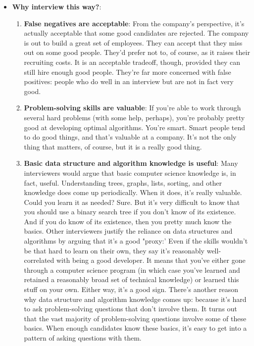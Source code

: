 \documentclass{report}
\begin{document}
\begin{itemize}
\begin{itemize}
            \end{itemize}
        \item \textbf{Why interview this way?}: 
            \begin{enumerate}
                \item \textbf{False negatives are acceptable}:  From the company's perspective, it's actually acceptable that some good candidates are rejected. The company is out to build a great set of employees. They can accept that they miss out on some good people. They'd prefer not to, of course, as it raises their recruiting costs. It is an acceptable tradeoff, though, provided they can still hire enough good people. 
                    \bigbreak \noindent 
                    They're far more concerned with false positives: people who do well in an interview but are not in fact very good.
                \item \textbf{Problem-solving skills are valuable}: If you're able to work through several hard problems (with some help, perhaps), you're probably pretty good at developing optimal algorithms. You're smart. 
                    \bigbreak \noindent 
                    Smart people tend to do good things, and that's valuable at a company. It's not the only thing that matters, of course, but it is a really good thing.
                \item \textbf{Basic data structure and algorithm knowledge is useful}: Many interviewers would argue that basic computer science knowledge is, in fact, useful. Understanding trees, graphs, lists, sorting, and other knowledge does come up periodically. When it does, it's really valuable.
                    \bigbreak \noindent 
                    Could you learn it as needed? Sure. But it's very difficult to know that you should use a binary search tree if you don't know of its existence. And if you do know of its existence, then you pretty much know the basics.
                    \bigbreak \noindent 
                    Other interviewers justify the reliance on data structures and algorithms by arguing that it's a good "proxy:' Even if the skills wouldn't be that hard to learn on their own, they say it's reasonably well-correlated with being a good developer. It means that you've either gone through a computer science program (in which case you've learned and retained a reasonably broad set of technical knowledge) or learned this stuff on your own. Either way, it's a good sign.
                    \bigbreak \noindent 
                    There's another reason why data structure and algorithm knowledge comes up: because it's hard to ask problem-solving questions that don't involve them. It turns out that the vast majority of problem-solving questions involve some of these basics. When enough candidates know these basics, it's easy to get into a pattern of asking questions with them.

\end{enumerate}
\end{itemize}
\end{document}
